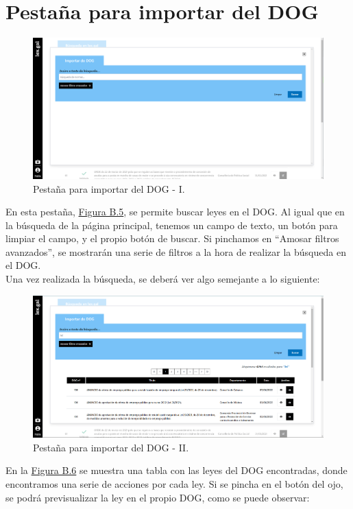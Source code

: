 \section{Pestaña para importar del DOG}
\label{PBusquedaDOG}

\begin{figure}[H]
\centerline{\includegraphics[width=12cm]{figuras/manualUsuario/BuscarDOG.PNG}}
\caption{Pestaña para importar del DOG - I.}
\label{enlacePBusquedaDOG}
\end{figure}

En esta pestaña, \hyperref[enlacePBusquedaDOG]{Figura B.5}, se permite buscar leyes en el DOG. Al igual que en la búsqueda de la página principal, tenemos un campo de texto, un botón para limpiar el campo, y el propio botón de buscar. Si pinchamos en ``Amosar filtros avanzados'', se mostrarán una serie de filtros a la hora de realizar la búsqueda en el DOG.
\\

Una vez realizada la búsqueda, se deberá ver algo semejante a lo siguiente:

\begin{figure}[H]
\centerline{\includegraphics[width=12cm]{figuras/manualUsuario/BuscarDOGCompleta.PNG}}
\caption{Pestaña para importar del DOG - II.}
\label{enlacePBusquedaCDOG}
\end{figure}

En la \hyperref[enlacePBusquedaCDOG]{Figura B.6} se muestra una tabla con las leyes del DOG encontradas, donde encontramos una serie de acciones por cada ley. Si se pincha en el botón del ojo, se podrá previsualizar la ley en el propio DOG, como se puede observar:

